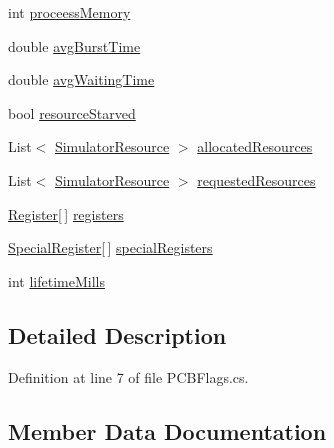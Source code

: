 \begin{DoxyCompactItemize}
\item 
int \hyperlink{struct_c_p_u___o_s___simulator_1_1_operating___system_1_1_p_c_b_flags_a4248a993bf5be874fcd2843269bb9058}{proceess\+Memory}
\item 
double \hyperlink{struct_c_p_u___o_s___simulator_1_1_operating___system_1_1_p_c_b_flags_a1c7b8ae576214d5e26c37727b15b8833}{avg\+Burst\+Time}
\item 
double \hyperlink{struct_c_p_u___o_s___simulator_1_1_operating___system_1_1_p_c_b_flags_ae6d30d555620b4fe5a92baea4ad933d1}{avg\+Waiting\+Time}
\item 
bool \hyperlink{struct_c_p_u___o_s___simulator_1_1_operating___system_1_1_p_c_b_flags_ad9a23e852aa137ab0289efebb5645b19}{resource\+Starved}
\item 
List$<$ \hyperlink{class_c_p_u___o_s___simulator_1_1_operating___system_1_1_simulator_resource}{Simulator\+Resource} $>$ \hyperlink{struct_c_p_u___o_s___simulator_1_1_operating___system_1_1_p_c_b_flags_a2ba3b061d4ea3ab2da4520a2c4333229}{allocated\+Resources}
\item 
List$<$ \hyperlink{class_c_p_u___o_s___simulator_1_1_operating___system_1_1_simulator_resource}{Simulator\+Resource} $>$ \hyperlink{struct_c_p_u___o_s___simulator_1_1_operating___system_1_1_p_c_b_flags_a66bd7208370a7e6babe80abb6a07dbd4}{requested\+Resources}
\item 
\hyperlink{class_c_p_u___o_s___simulator_1_1_c_p_u_1_1_register}{Register}\mbox{[}$\,$\mbox{]} \hyperlink{struct_c_p_u___o_s___simulator_1_1_operating___system_1_1_p_c_b_flags_a98e0200286634bee59fa4e0b94daf5bc}{registers}
\item 
\hyperlink{class_c_p_u___o_s___simulator_1_1_c_p_u_1_1_special_register}{Special\+Register}\mbox{[}$\,$\mbox{]} \hyperlink{struct_c_p_u___o_s___simulator_1_1_operating___system_1_1_p_c_b_flags_aa313adebffa50118e5fbaa09122b32fd}{special\+Registers}
\item 
int \hyperlink{struct_c_p_u___o_s___simulator_1_1_operating___system_1_1_p_c_b_flags_a8079f3c5421cf89d5019718f857b4c7e}{lifetime\+Mills}
\end{DoxyCompactItemize}


\subsection{Detailed Description}


Definition at line 7 of file P\+C\+B\+Flags.\+cs.



\subsection{Member Data Documentation}
\hypertarget{struct_c_p_u___o_s___simulator_1_1_operating___system_1_1_p_c_b_flags_a2ba3b061d4ea3ab2da4520a2c4333229}{}

